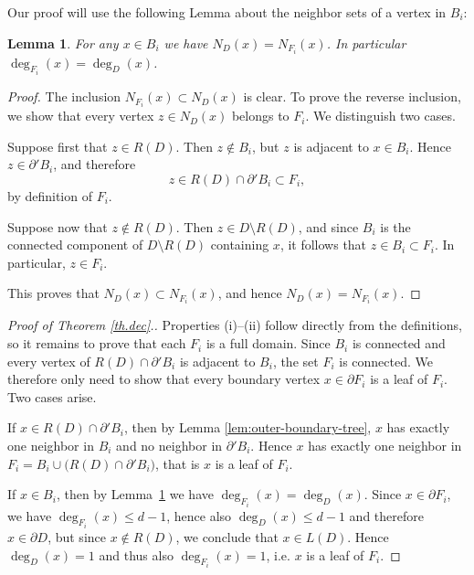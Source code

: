 \documentclass[a4paper, 11pt]{article}
\numberwithin{equation}{section}
\newtheorem{lemma}[theorem]{Lemma}
\theoremstyle{definition}
\theoremstyle{remark}
\begin{document}
\medskip

Our proof will use the following Lemma about the neighbor sets of a vertex in $B_i$: 
\begin{lemma}\label{lem:neighbors-Ci}
For any $x\in B_i$ we have $N_{D}(x)=N_{F_i}(x)$. In particular $\deg_{F_i}(x)=\deg_D(x)$.
\end{lemma}

\begin{proof}
The inclusion $N_{F_i}(x)\subset N_D(x)$ is clear.
To prove the reverse inclusion, we show that every vertex $z\in N_D(x)$
belongs to $F_i$. We distinguish two cases.

\smallskip

Suppose first that $z\in R(D)$. Then $z\notin B_i$, but $z$ is adjacent to
$x\in B_i$. Hence $z\in \partial' B_i$, and therefore
\[
z\in R(D)\cap \partial' B_i \subset F_i,
\]
by definition of $F_i$.

\smallskip

Suppose now that $z\notin R(D)$. Then $z\in D\setminus R(D)$, and since $B_i$ is the connected component of $D\setminus R(D)$ containing $x$, it follows that $z\in B_i\subset F_i$. In particular, $z\in F_i$.

\smallskip

This proves that $N_D(x)\subset N_{F_i}(x)$, and hence $N_D(x)=N_{F_i}(x)$. 
\end{proof}

\medskip


\begin{proof}[Proof of Theorem \ref{th.dec}.]
Properties \textup{(i)}--\textup{(ii)} follow directly from the definitions, so it remains to prove that each $F_i$ is a full domain.
Since $B_i$ is connected and every vertex of $R(D)\cap \partial' B_i$ is adjacent to $B_i$, the set $F_i$ is connected. We therefore only need to show that every boundary vertex $x\in \partial F_i$ is a leaf of $F_i$. Two cases arise. 

\smallskip

If $x\in R(D)\cap \partial' B_i$, then by Lemma \ref{lem:outer-boundary-tree},   $x$ has exactly one neighbor in $B_i$ and no neighbor in $\partial' B_i$. Hence $x$ has exactly one neighbor in  $F_i = B_i \cup \bigl(R(D)\cap \partial' B_i\bigr)$, that is $x$ is a leaf of $F_i$.


\smallskip

If $x\in B_i$, then by Lemma~\ref{lem:neighbors-Ci}  we have  $\deg_{F_i}(x)=\deg_D(x)$. Since $x\in \partial F_i$, we have
$\deg_{F_i}(x)\le d-1$, hence also $\deg_D(x)\le d-1$ and therefore $x\in \partial D$, but since  $x\notin R(D)$, we conclude that $x\in L(D)$. Hence  $\deg_D(x)=1$ and thus also $\deg_{F_i}(x)=1$, i.e. $x$ is a leaf of $F_i$. 
\end{proof}
\end{document}
